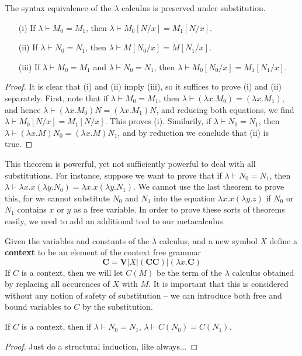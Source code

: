 \begin{theorem}
    The syntax equivalence of the $\lambda$ calculus is preserved under substitution.
    \begin{enumerate}
        \item[(i)] If $\lambda \vdash M_0 = M_1$, then $\lambda \vdash M_0[N/x] = M_1[N/x]$.
        \item[(ii)] If $\lambda \vdash N_0 = N_1$, then $\lambda \vdash M[N_0/x] = M[N_1/x]$.
        \item[(iii)] If $\lambda \vdash M_0 = M_1$ and $\lambda \vdash N_0 = N_1$, then $\lambda \vdash M_0[N_0/x] = M_1[N_1/x]$.
    \end{enumerate}
\end{theorem}
\begin{proof}
    It is clear that (i) and (ii) imply (iii), so it suffices to prove (i) and (ii) separately. First, note that if $\lambda \vdash M_0 = M_1$, then $\lambda \vdash (\lambda x.M_0) = (\lambda x.M_1)$, and hence $\lambda \vdash (\lambda x.M_0)N = (\lambda x.M_1)N$, and reducing both equations, we find $\lambda \vdash M_0[N/x] = M_1[N/x]$. This proves (i). Similarily, if $\lambda \vdash N_0 = N_1$, then $\lambda \vdash (\lambda x.M)N_0 = (\lambda x.M)N_1$, and by reduction we conclude that (ii) is true.
\end{proof}

This theorem is powerful, yet not sufficiently powerful to deal with all substitutions. For instance, suppose we want to prove that if $\lambda \vdash N_0 = N_1$, then $\lambda \vdash \lambda x.x(\lambda y.N_0) = \lambda x.x(\lambda y.N_1)$. We cannot use the last theorem to prove this, for we cannot substitute $N_0$ and $N_1$ into the equation $\lambda x.x(\lambda y.z)$ if $N_0$ or $N_1$ contains $x$ or $y$ as a free variable. In order to prove these sorts of theorems easily, we need to add an additional tool to our metacalculus.

Given the variables and constants of the $\lambda$ calculus, and a new symbol $X$ define a {\bf context} to be an element of the context free grammar
%
\[ \mathbf{C} = \mathbf{V} | X | (\mathbf{C} \mathbf{C}) | (\lambda x.\mathbf{C}) \]
%
If $C$ is a context, then we will let $C(M)$ be the term of the $\lambda$ calculus obtained by replacing all occurences of $X$ with $M$. It is important that this is considered without any notion of safety of substitution -- we can introduce both free and bound variables to $C$ by the substitution.

\begin{theorem}
    If $C$ is a context, then if $\lambda \vdash N_0 = N_1$, $\lambda \vdash C(N_0) = C(N_1)$.
\end{theorem}
\begin{proof}
    Just do a structural induction, like always...
\end{proof}

